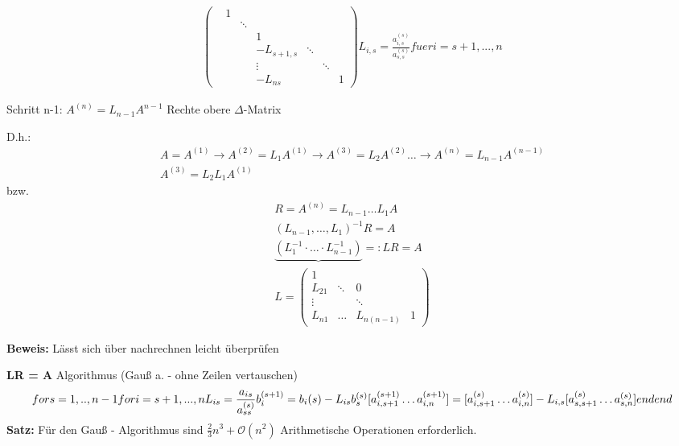 \begin{equation*}
\begin{aligned}
\begin{pmatrix}
					  & 1 &        &            &        &        & \\
						&   & \ddots &            &        &        & \\
						&   &        & 1          &        &        & \\
						&   &        & -L_{s+1,s} & \ddots &        & \\
						&   &        & \vdots     &        & \ddots & \\
						&   &        & -L_{ns}    &        &        & 1
		      \end{pmatrix}
		L_{i,s} = \frac{a_{i,s}^{(s)}}{a_{s,s}^{(s)}}    fuer i = s + 1, ..., n
  \end{aligned}
\end{equation*}

Schritt n-1: $A^{\left(n\right)} = L_{n-1}A^{n-1}$
Rechte obere
$\Delta$-Matrix

D.h.: 
\begin{equation*}
  \begin{aligned}
A = A^{(1)} \rightarrow A^{(2)} = L_1A^{(1)} \rightarrow A^{(3)} = L_2A^{(2)} \ldots \rightarrow A^{(n)} = L_{n-1}A^{(n-1)} \\
A^{(3)} = L_2L_1A^{(1)}
  \end{aligned}
\end{equation*}
bzw.
\begin{equation*}
  \begin{aligned}
    R = A^{(n)} = L_{n-1} \ldots L_1 A  \\
		(L_{n-1}, \ldots, L_1)^{-1}R = A  \\
		\underbrace{(L_1^{-1} \cdot \ldots \cdot L_{n-1}^{-1})}{=:L}R = A  \\
		L = \begin{pmatrix}
		    1      &        &        &  \\
				L_{21} & \ddots & 0      &  \\
				\vdots &        & \ddots &  \\
				L_{n1} & \ldots & L_{n\left(n-1\right)} & 1
		    \end{pmatrix}
	\end{aligned}
\end{equation*}

\textbf{Beweis:}
Lässt sich über nachrechnen leicht überprüfen

\textbf{LR = A} %
Algorithmus (Gauß a. - ohne Zeilen vertauschen)
\begin{equation*}
  for s = 1, .., n-1  \\
	  for i = s+1, ..., n  \\
		  L_{is} = \frac{a_{is}}{a_{ss}^{\left(s\right)}}  \\
			b_i^{\left(s+1\right)} = b_i{\left(s\right)} - L_{is}b_s^{\left(s\right)}
			[a_{i, s+1}^{(s+1)} \ldots a_{i,n}^{(s+1)}] = [a_{i, s+1}^{(s)} \ldots a_{i,n}^{(s)}] - L_{i,s}[a_{s,s+1}^{(s)} \ldots a_{s,n}^{(s)}]
		end
	end
\end{equation*}
%
\textbf{Satz:}
Für den Gauß - Algorithmus sind $\frac{2}{3}n^3 + \mathcal O(n^2)$ Arithmetische Operationen erforderlich.

